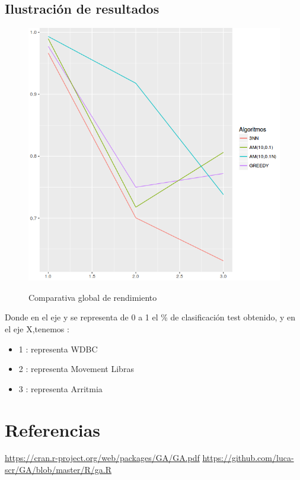 \documentclass[	DIV=calc,%
							paper=a4,%
							fontsize=11pt,
							onecolumn]{scrartcl}	 					%
\begin{document}
\subsection*{Ilustración de resultados}

\begin{figure}[H] %
\centering
\includegraphics[scale=0.55]{comparativa.png}  %
\label{}
\caption{Comparativa global de rendimiento }   
\end{figure}
Donde en el eje y se representa de 0 a 1 el \% de clasificación test obtenido, y en el eje X,tenemos : 
\begin{itemize}
\item 1 : representa WDBC
\item 2 : representa Movement Libras
\item 3 : representa Arritmia
\end{itemize}

\section*{Referencias}
\url{https://cran.r-project.org/web/packages/GA/GA.pdf}
\url{https://github.com/luca-scr/GA/blob/master/R/ga.R}
\end{document}
